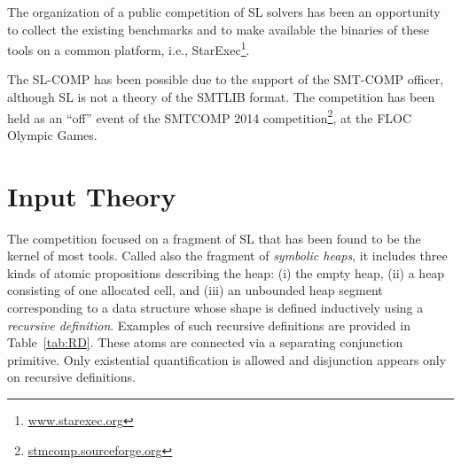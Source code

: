\documentclass{llncs}
\begin{document}
The organization of a public competition of SL solvers has been an opportunity 
to collect the existing benchmarks and  
to make available the binaries of these tools on a common platform, i.e., StarExec\footnote{\url{www.starexec.org}}.

The SL-COMP has been possible due to the support of the SMT-COMP officer, 
although SL is not a theory of the SMTLIB format.
The competition has been held as an ``off'' event
of the SMTCOMP 2014 competition\footnote{\url{stmcomp.sourceforge.org}}, at the FLOC Olympic Games.


\section{Input Theory}

The competition focused on a fragment of SL that has been found to be the kernel of most tools.
Called also the fragment of \emph{symbolic heaps}, 
it includes three kinds of atomic propositions describing the heap:
(i) the empty heap, 
(ii) a heap consisting of one allocated cell, and
(iii) an unbounded heap segment corresponding to a data structure whose shape is defined inductively using a \emph{recursive definition}. 
Examples of such recursive definitions are provided in Table~\ref{tab:RD}.
These atoms are connected via a separating conjunction primitive. 
Only existential quantification is allowed and 
disjunction appears only on recursive definitions. 

\end{document}
